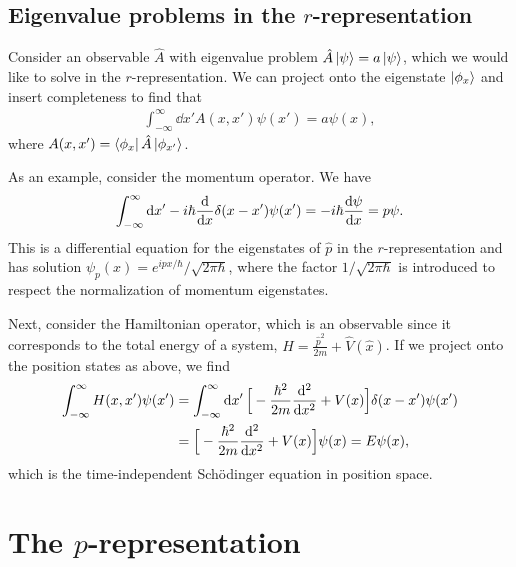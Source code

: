 \subsection{Eigenvalue problems in the $r$-representation}

Consider an observable $\hat{A}$ with eigenvalue problem $\hat{A} \ket{\psi} = a \ket{\psi}$, which we would like to solve in the $r$-representation.
We can project onto the eigenstate $\ket{\phi_{x}}$ and insert completeness to find that
\begin{eqnarray}
    \int_{-\infty}^{\infty} \dd{x'} A(x,x') \psi(x') = a \psi(x)
,\end{eqnarray}
where $A(x,x') = \bra{\phi_{x}} \hat{A} \ket{\phi_{x'}}$.

As an example, consider the momentum operator.
We have
\begin{eqnarray}
    \int_{-\infty}^{\infty} \dd{x'} -i\hbar \dv{x} \delta(x-x') \psi(x') = -i\hbar \dv{\psi}{x} = p \psi
.\end{eqnarray}
This is a differential equation for the eigenstates of $\hat{p}$ in the $r$-representation and has solution $\psi_{p}(x) = e^{i p x / \hbar} / \sqrt{2 \pi \hbar}$, where the factor $1/\sqrt{2 \pi \hbar}$ is introduced to respect the normalization of momentum eigenstates.

Next, consider the Hamiltonian operator, which is an observable since it corresponds to the total energy of a system, $\hat{H} = \frac{\hat{p}^2}{2m} + \hat{V}(\hat{x})$.
If we project onto the position states as above, we find
\begin{align}
    \int_{-\infty}^{\infty} H(x,x') \psi(x') &= \int_{-\infty}^{\infty} \dd{x'} \Big[ -\frac{\hbar^2}{2m} \dv[2]{x} + V(x) \Big] \delta(x-x') \psi(x') \nonumber \\
                                             &= \Big[ -\frac{\hbar^2}{2m} \dv[2]{x} + V(x) \Big] \psi(x) = E \psi(x)
,\end{align}
which is the time-independent Sch\"{o}dinger equation in position space.


\section{The $p$-representation}


